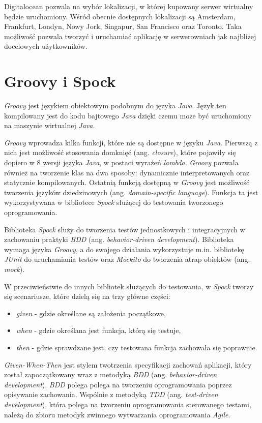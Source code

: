 Digitalocean pozwala na wybór lokalizacji, w której kupowany serwer wirtualny będzie uruchomiony. Wśród obecnie dostępnych lokalizacji są Amsterdam, Frankfurt, Londyn, Nowy Jork, Singapur, San Francisco oraz Toronto. Taka możliwość pozwala tworzyć i uruchamiać aplikację w serwerowniach jak najbliżej docelowych użytkowników. 

\section{Groovy i Spock} 
\label{groovy_and_spock}

\textsl{Groovy} jest językiem obiektowym podobnym do języka \textsl{Java}. Język ten kompilowany jest do kodu bajtowego \textsl{Java} dzięki czemu może być uruchomiony na maszynie wirtualnej \textsl{Java}. 

\textsl{Groovy} wprowadza kilka funkcji, które nie są dostępne w języku \textsl{Java}. Pierwszą z nich jest możliwość stosowania domknięć (ang. \textsl{closure}), które pojawiły się dopiero w 8 wersji języka \textsl{Java}, w postaci wyrażeń \textsl{lambda}. \textsl{Groovy} pozwala również na tworzenie klas na dwa sposoby: dynamicznie interpretowanych oraz statycznie kompilowanych. Ostatnią funkcją dostępną w \textsl{Groovy} jest możliwość tworzenia języków dziedzinowych (ang. \textsl{domain-specific language}). Funkcja ta jest wykorzystywana w bibliotece \textsl{Spock} służącej do testowania tworzonego oprogramowania.

Biblioteka \textsl{Spock} służy do tworzenia testów jednostkowych i integracyjnych w zachowaniu praktyki \textsl{BDD} (ang. \textsl{behavior-driven development}). Biblioteka wymaga języka \textsl{Groovy}, a do swojego działania wykorzystuje m.in. bibliotekę \textsl{JUnit} do uruchamiania testów oraz \textsl{Mockito} do tworzenia atrap obiektów (ang. \textsl{mock}). 

W przeciwieństwie do innych bibliotek służących do testowania, w \textsl{Spock} tworzy się scenariusze, które dzielą się na trzy główne części: 
\begin{itemize}
    \item \textsl{given} - gdzie określane są założenia początkowe,
    \item \textsl{when} - gdzie określana jest funkcja, którą się testuje,
    \item \textsl{then} - gdzie sprawdzane jest, czy testowana funkcja zachowała się poprawnie.
\end{itemize}
\textsl{Given-When-Then} jest stylem twotrzenia specyfikacji zachowań aplikacji, który został zapoczątkowany wraz z metodyką \textsl{BDD} (ang. \textsl{behavior-driven development}). \textsl{BDD} polega polega na tworzeniu oprogramowania poprzez opisywanie zachowania. Wspólnie z metodyką \textsl{TDD} (ang. \textsl{test-driven development}), która polega na tworzeniu oprogramowania sterowanego testami, należą do zbioru metodyk zwinnego wytwarzania oprogramowania \textsl{Agile}.